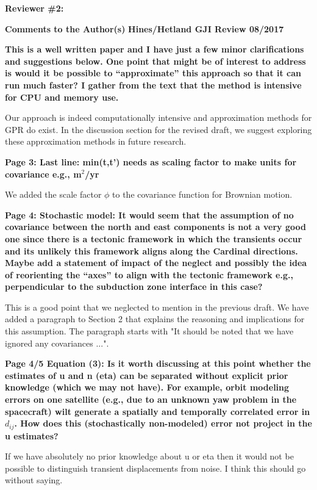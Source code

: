 \documentclass[10pt,a4paper]{letter}
\begin{document}
\begin{letter}{}

\textbf{Reviewer \#2:}\newline

\textbf{Comments to the Author(s)}
\textbf{Hines/Hetland GJI Review 08/2017}

\textbf{This is a well written paper and I have just a few minor
clarifications and suggestions below.  One point that might be of
interest to address is would it be possible to “approximate” this
approach so that it can run much faster?  I gather from the text that
the method is intensive for CPU and memory use.}

Our approach is indeed computationally intensive and approximation
methods for GPR do exist. In the discussion section for the revised
draft, we suggest exploring these approximation methods in future
research. 

\textbf{Page 3: Last line: min(t,t’) needs as scaling factor to make
units for covariance e.g., m$^2$/yr}

We added the scale factor $\phi$ to the covariance function for
Brownian motion.

\textbf{Page 4: Stochastic model: It would seem that the assumption of no
covariance between the north and east components is not a very good
one since there is a tectonic framework in which the transients occur
and its unlikely this framework aligns along the Cardinal directions.
Maybe add a statement of impact of the neglect and possibly the idea
of reorienting the “axes” to align with the tectonic framework e.g.,
perpendicular to the subduction zone interface in this case?}

This is a good point that we neglected to mention in the previous
draft. We have added a paragraph to Section 2 that explains the
reasoning and implications for this assumption. The paragraph starts
with "It should be noted that we have ignored any covariances ...".

\textbf{Page 4/5 Equation (3): Is it worth discussing at this point whether
the estimates of u and n (eta) can be separated without explicit prior
knowledge (which we may not have).  For example, orbit modeling errors
on one satellite (e.g., due to an unknown yaw problem in the
spacecraft) wilt generate a spatially and temporally correlated error
in $d_{ij}$.  How does this (stochastically non-modeled) error not project
in the u estimates?}

If we have absolutely no prior knowledge about u or eta then it would
not be possible to distinguish transient displacements from noise. I
think this should go without saying.


\end{letter}
\end{document}
